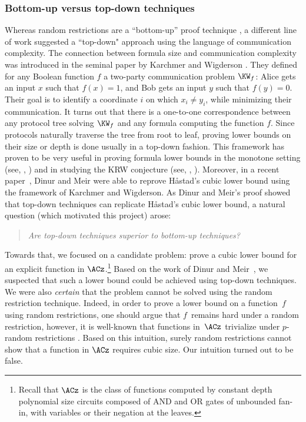 \documentclass{toc}
\begin{document}
%
\subsubsection{Bottom-up versus top-down techniques}
%

Whereas random restrictions are a ``bottom-up'' proof technique
\cite{HJP95}, a different line of work suggested a ``top-down"
approach using the language of communication complexity. The connection
between formula size and communication complexity was introduced in
the seminal %
paper by %
Karchmer and Wigderson \cite{KW90}. They defined
for any Boolean function $f$ a two-party communication problem $\KW_{f}$:
Alice gets an input $x$ such that $f(x)=1$, and Bob gets an input
$y$ such that $f(y)=0$. Their goal is to identify a coordinate $i$
on which $x_{i}\neq y_{i}$, while minimizing their communication.
It turns out that there is a one-to-one correspondence between any
protocol tree solving $\KW_{f}$ and any formula computing the function
$f$. Since protocols naturally traverse the tree from root to leaf,
proving lower bounds on their size or depth is done usually in a top-down
fashion. This framework has proven to be very useful in proving formula
lower bounds in the monotone setting (see, \eg, \cite{KW90,GH92,RW92,KRW95,RM99,GP18,PR17})
and in studying the KRW conjecture (see, \eg, \cite{KRW95,EIRS01,HW93,GMWW17,DM18,KM18,M20,RMNPR20,MS21}).
Moreover,
%
in a recent paper~\cite{DM18}, Dinur and Meir were able to %
reprove H{\aa}stad's cubic lower bound using the framework of Karchmer
and Wigderson. As Dinur and Meir's proof showed that top-down techniques
can replicate H{\aa}stad's cubic lower bound, a natural question
(which motivated this project) arose: 
\begin{quote}
\emph{Are top-down techniques superior to bottom-up techniques?} 
\end{quote}
Towards that, we focused on a candidate problem: prove a cubic lower
bound for an explicit function in $\ACz$.\footnote{Recall that $\ACz$ is the class of functions computed by constant
depth polynomial size circuits composed of AND and OR gates of unbounded
fan-in, with variables or their negation at the leaves.} Based on the 
work of Dinur and Meir~\cite{DM18}, we suspected that
such a lower bound could be achieved using top-down techniques. We
were also \emph{certain} that the problem cannot be solved using the
random restriction technique. Indeed, in order to prove a lower bound
on a function~$f$ using random restrictions, one should argue that
$f$~remains hard under a random restriction, however, it is well-known
that functions in~$\ACz$ trivialize under $p$-random restrictions
\cite{A83,FSS84,Y85,H86}. Based on this intuition, surely random
restrictions cannot show that a function in $\ACz$ requires cubic
size. Our intuition turned out to be false.
\end{document}

